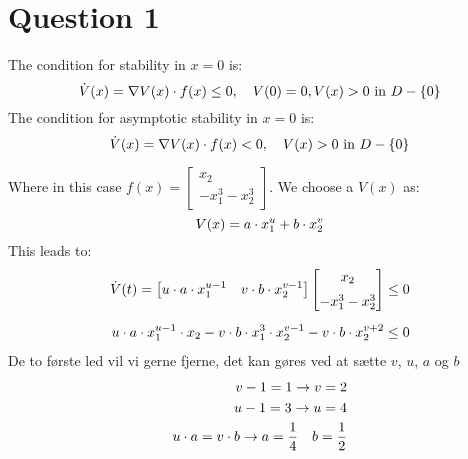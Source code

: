 \chapter{Question 1}

The condition for stability in $x = 0$ is:
\begin{equation}
  \dot{V}(x) = \nabla V(x)\cdot f(x) \leq 0,\quad V(0) = 0, V(x)>0 \text{ in } D - \{0\}
\end{equation}
The condition for asymptotic stability in $x = 0$ is:
\begin{equation}
  \dot{V}(x) = \nabla V(x)\cdot f(x) < 0,\quad  V(x)>0 \text{ in } D - \{0\}
\end{equation}

Where in this case $f(x) = \begin{bmatrix} x_2 \\[2mm] -x_{1}^{3} - x_{2}^3 \end{bmatrix}$. We choose a $V(x)$ as:
\begin{equation}
          V(x) = a \cdot x_{1}^{u} + b \cdot x_{2}^{v}
\end{equation}
This leads to:
\begin{equation}
\begin{split}
        \dot{V}(t) = 
        \begin{bmatrix} 
        u \cdot a \cdot x_{1}^{u-1}  & v \cdot b \cdot x_{2}^{v-1} 
        \end{bmatrix}
        \begin{bmatrix} 
        x_2 \\[2mm]
        -x_{1}^{3} - x_{2}^3 
        \end{bmatrix}
        \leq 0 \\[2mm]
        u \cdot a \cdot x_{1}^{u-1} \cdot x_2 - v \cdot b \cdot x_{1}^{3} \cdot x_{2}^{v-1} - v \cdot b \cdot x_{2}^{v+2} \leq 0
\end{split}
\end{equation}
De to første led vil vi gerne fjerne, det kan gøres ved at sætte $v$, $u$, $a$ og $b$
\begin{equation}
\begin{split}
        v-1 = 1 \rightarrow v=2 \\
        u-1 = 3 \rightarrow u=4 \\
        u \cdot a = v \cdot b \rightarrow a=\frac{1}{4} \quad b=\frac{1}{2}
\end{split}
\end{equation}

